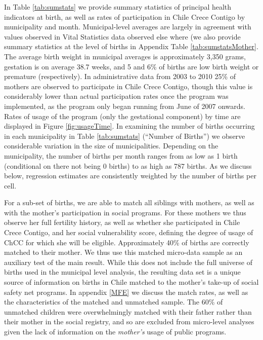 \documentclass[12pt]{article}
\begin{document}
\begin{spacing}{1.4}
In Table \ref{tab:sumstats} we provide summary statistics of
principal health indicators at birth, as well as rates of participation
in Chile Crece Contigo by municipality and month.  Municipal-level
averages are largely in agreement with values observed in Vital
Statistics data observed else where (we also provide summary statistics
at the level of births in Appendix Table \ref{tab:sumstatsMother}.  The
average birth weight in municipal averages is approximately 3,350 grams,
gestation is on average 38.7 weeks, and 5 and 6\% of births are low birth
weight or premature (respectively).  In administrative data from 2003 to
2010 25\% of mothers are observed to participate in Chile Crece Contigo,
though this value is considerably lower than actual participation rates
once the program was implemented, as the program only began running from
June of 2007 onwards.  Rates of usage of the program (only the gestational
component) by time are displayed in Figure \ref{fig:usageTime}. In
examining the number of births occurring in each municipality in
Table \ref{tab:sumstats} (``Number of Births'') we observe considerable
variation in the size of municipalities. Depending on the municipality,
the number of births per month ranges from as low as 1 birth (conditional
on there not being 0 births) to as high as 787 births.  As we discuss
below, regression estimates are consistently weighted by the number of
births per cell.

For a sub-set of births, we are able to match all siblings with
mothers, as well as with the mother's participation in social
programs.  For these mothers we thus observe her full fertility
history, as well as whether she participated in Chile Crece Contigo,
and her social vulnerability score, defining the degree of usage
of ChCC for which she will be eligible.  Approximately 40\% of
births are correctly matched to their mother.  We thus use this
matched micro-data sample as an auxiliary test of the main result.
While this does not include the full universe of births used in
the municipal level analysis, the resulting data set is a unique
source of information on births in Chile matched to the mother's
take-up of social safety net programs.  In appendix \ref{MFE}
we discuss the match rates, as well as the characteristics of
the matched and unmatched sample.  The 60\% of unmatched children
were overwhelmingly matched with their father rather than their
mother in the social registry, and so are excluded from micro-level
analyses given the lack of information on the \emph{mother's} usage
of public programs.


\end{spacing}
\end{document}

